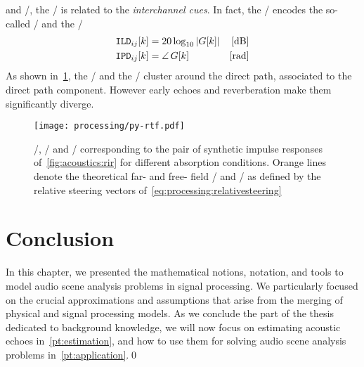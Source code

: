 

 and \CASA/, the \ReTF/ is related to the \textit{interchannel cues}.
In fact, the \ReTFs/ encodes the so-called \ILD/ and the \IPD/
\begin{equation}
    \begin{aligned}
        \ild_{\idxMicSrc}[k] &= 20 \log_{10} \magnitudeOf{G[k]} & [\si{\dB}]\\
        \ipd_{\idxMicSrc}[k] &= \phaseOf{G[k]} \mathspace       & [\si{\radian}]
    \end{aligned}
\end{equation}
As shown in~\cref{fig:processing:ildipd}, the \ILD/ and the \IPD/ cluster around the direct path, associated to the direct path component.
However early echoes and reverberation make them significantly diverge.

\begin{figure}[]
    \begin{fullwidth}
        \texttt{[image: processing/py-rtf.pdf]}
        \caption{
            \RIR/, \ILD/ and \IPD/ corresponding to the pair of synthetic impulse responses of~\cref{fig:acoustics:rir} for different absorption conditions.
            Orange lines denote the theoretical far- and free- field \ILD/ and \IPD/ as defined by the relative steering vectors of~\cref{eq:processing:relativesteering}
        }\label{fig:processing:ildipd}
    \end{fullwidth}
\end{figure}



\section{Conclusion}
In this chapter, we presented the mathematical notions, notation, and tools to model audio scene analysis problems in signal processing.
We particularly focused on the crucial approximations and assumptions that arise from the merging of physical and signal processing models.
As we conclude the part of the thesis dedicated to background knowledge, we will now focus on estimating acoustic echoes in~\cref{pt:estimation}, and how to use them for solving audio scene analysis problems in~\cref{pt:application}.\qed